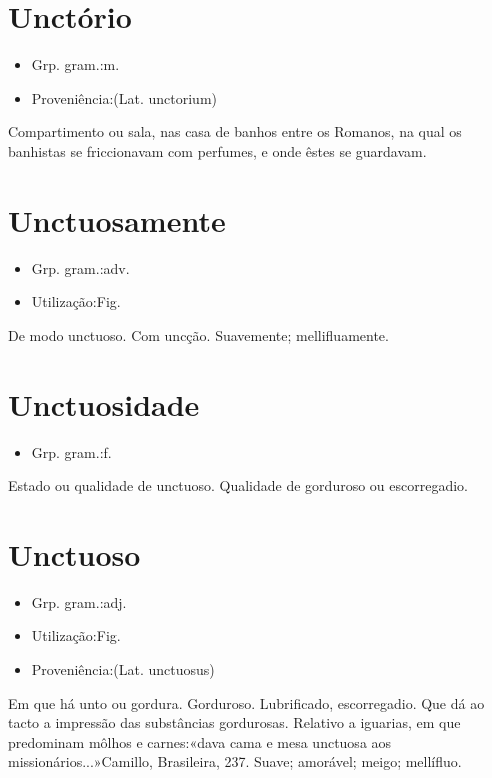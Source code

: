 \documentclass{article}
\begin{document}
\section{Unctório}
\begin{itemize}
\item {Grp. gram.:m.}
\end{itemize}
\begin{itemize}
\item {Proveniência:(Lat. \textunderscore unctorium\textunderscore )}
\end{itemize}
Compartimento ou sala, nas casa de banhos entre os Romanos, na qual os banhistas se friccionavam com perfumes, e onde êstes se guardavam.
\section{Unctuosamente}
\begin{itemize}
\item {Grp. gram.:adv.}
\end{itemize}
\begin{itemize}
\item {Utilização:Fig.}
\end{itemize}
De modo unctuoso.
Com uncção.
Suavemente; mellifluamente.
\section{Unctuosidade}
\begin{itemize}
\item {Grp. gram.:f.}
\end{itemize}
Estado ou qualidade de unctuoso.
Qualidade de gorduroso ou escorregadio.
\section{Unctuoso}
\begin{itemize}
\item {Grp. gram.:adj.}
\end{itemize}
\begin{itemize}
\item {Utilização:Fig.}
\end{itemize}
\begin{itemize}
\item {Proveniência:(Lat. \textunderscore unctuosus\textunderscore )}
\end{itemize}
Em que há unto ou gordura.
Gorduroso.
Lubrificado, escorregadio.
Que dá ao tacto a impressão das substâncias gordurosas.
Relativo a iguarias, em que predominam môlhos e carnes:«\textunderscore dava cama e mesa unctuosa aos missionários...\textunderscore »Camillo, \textunderscore Brasileira\textunderscore , 237.
Suave; amorável; meigo; mellífluo.
\end{document}
